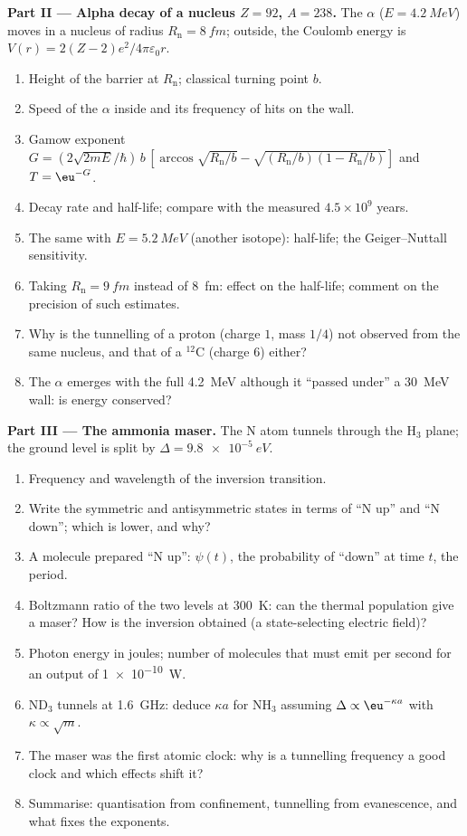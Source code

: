 \begin{problem}
\textbf{Part II --- Alpha decay of a nucleus $Z = 92$, $A = 238$.}
The $\alpha$ ($E = \qty{4.2}{MeV}$) moves in a nucleus of radius
$R_{\text{n}} = \qty{8}{fm}$; outside, the Coulomb energy is $V(r) =
2(Z - 2)e^2/4\pi\varepsilon_0r$.
\begin{enumerate}[resume]
  \item Height of the barrier at $R_{\text{n}}$; classical turning point
        $b$.
  \item Speed of the $\alpha$ inside and its frequency of hits on the
        wall.
  \item Gamow exponent $G = (2\sqrt{2mE}/\hbar)\,b\,[\arccos\sqrt{R_{\text{n}}/b}
        - \sqrt{(R_{\text{n}}/b)(1 - R_{\text{n}}/b)}]$ and $T = \eu^{-G}$.
  \item Decay rate and half-life; compare with the measured $4.5 \times
        10^9$ years.
  \item The same with $E = \qty{5.2}{MeV}$ (another isotope): half-life;
        the Geiger--Nuttall sensitivity.
  \item Taking $R_{\text{n}} = \qty{9}{fm}$ instead of \qty{8}{fm}: effect on
        the half-life; comment on the precision of such estimates.
  \item Why is the tunnelling of a proton (charge $1$, mass $1/4$)
        not observed from the same nucleus, and that of a $^{12}$C
        (charge $6$) either?
  \item The $\alpha$ emerges with the full \qty{4.2}{MeV} although it
        ``passed under'' a \qty{30}{MeV} wall: is energy conserved?
\end{enumerate}

\textbf{Part III --- The ammonia maser.}
The N atom tunnels through the H$_3$ plane; the ground level is split
by $\Delta = \qty{9.8e-5}{eV}$.
\begin{enumerate}[resume]
  \item Frequency and wavelength of the inversion transition.
  \item Write the symmetric and antisymmetric states in terms of
        ``N up'' and ``N down''; which is lower, and why?
  \item A molecule prepared ``N up'': $\psi(t)$, the probability of
        ``down'' at time $t$, the period.
  \item Boltzmann ratio of the two levels at \qty{300}{K}: can the
        thermal population give a maser? How is the inversion obtained
        (a state-selecting electric field)?
  \item Photon energy in joules; number of molecules that must emit
        per second for an output of \qty{1e-10}{W}.
  \item ND$_3$ tunnels at \qty{1.6}{GHz}: deduce $\kappa a$ for NH$_3$
        assuming $\Delta \propto \eu^{-\kappa a}$ with $\kappa \propto \sqrt{m}$.
  \item The maser was the first atomic clock: why is a tunnelling
        frequency a good clock and which effects shift it?
  \item Summarise: quantisation from confinement, tunnelling from
        evanescence, and what fixes the exponents.
\end{enumerate}
\end{problem}
